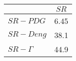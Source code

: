 \begin{tabular}{l|c}
\toprule
{} &  $SR$ \\
\midrule
\textbf{$SR-PDG$   } &  6.45 \\
\textbf{$SR-Deng$  } &  38.1 \\
\textbf{$SR-\Gamma$} &  44.9 \\
\bottomrule
\end{tabular}

